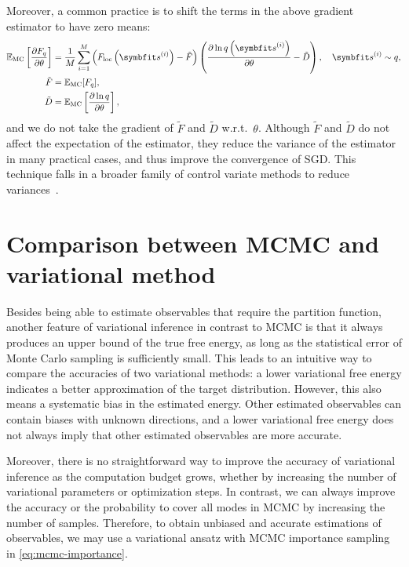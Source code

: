 Moreover, a common practice is to shift the terms in the above gradient estimator to have zero means:
\begin{align}
\bbE_\text{MC}\left[ \frac{\partial F_q}{\partial \theta} \right]
&= \frac{1}{M} \sum_{i = 1}^M \left( F_\text{loc}\left( \vs^{(i)} \right) - \tilde{F} \right) \left( \frac{\partial \ln q\left( \vs^{(i)} \right)}{\partial \theta} - \tilde{D} \right), \quad
\vs^{(i)} \sim q, \label{eq:fq-grad-baseline} \\
\tilde{F} &= \bbE_\text{MC}[F_q], \\
\tilde{D} &= \bbE_\text{MC}\left[ \frac{\partial \ln q}{\partial \theta} \right],
\end{align}
and we do not take the gradient of $\tilde{F}$ and $\tilde{D}$ w.r.t.\ $\theta$. Although $\tilde{F}$ and $\tilde{D}$ do not affect the expectation of the estimator, they reduce the variance of the estimator in many practical cases, and thus improve the convergence of SGD. This technique falls in a broader family of control variate methods to reduce variances~\cite{ranganath2014black}.

\section{Comparison between MCMC and variational method}
\label{sec:compare-mcmc}

Besides being able to estimate observables that require the partition function, another feature of variational inference in contrast to MCMC is that it always produces an upper bound of the true free energy, as long as the statistical error of Monte Carlo sampling is sufficiently small. This leads to an intuitive way to compare the accuracies of two variational methods: a lower variational free energy indicates a better approximation of the target distribution. However, this also means a systematic bias in the estimated energy. Other estimated observables can contain biases with unknown directions, and a lower variational free energy does not always imply that other estimated observables are more accurate.

Moreover, there is no straightforward way to improve the accuracy of variational inference as the computation budget grows, whether by increasing the number of variational parameters or optimization steps. In contrast, we can always improve the accuracy or the probability to cover all modes in MCMC by increasing the number of samples. Therefore, to obtain unbiased and accurate estimations of observables, we may use a variational ansatz with MCMC importance sampling in \cref{eq:mcmc-importance}.

